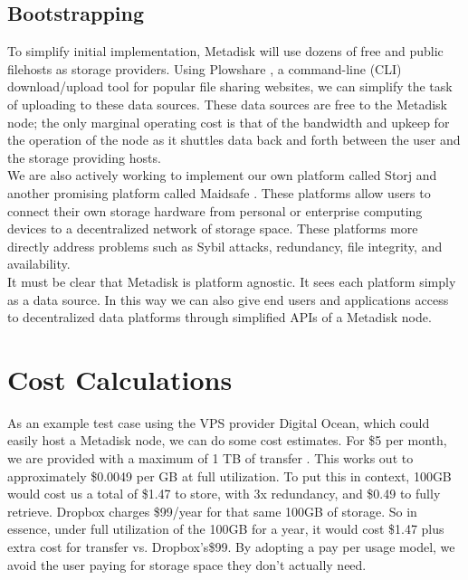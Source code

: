 \documentclass[a4paper,10pt]{article}
\begin{document}
\subsection{Bootstrapping}

To simplify initial implementation, Metadisk will use dozens of free and public filehosts as storage providers. Using Plowshare \cite{6}, a command-line (CLI) download/upload tool for popular file sharing websites, we can simplify the task of uploading to these data sources.  These data sources are free to the Metadisk node; the only marginal operating cost is that of the bandwidth and upkeep for the operation of the node as it shuttles data back and forth between the user and the storage providing hosts. \\

We are also actively working to implement our own platform called Storj \cite{7} and another promising platform called Maidsafe \cite{1}. These platforms allow users to connect their own storage hardware from personal or enterprise computing devices to a decentralized network of storage space. These platforms more directly address problems such as Sybil attacks, redundancy, file integrity, and availability.  \\

It must be clear that Metadisk is platform agnostic. It sees each platform simply as a data source. In this way we can also give end users and applications access to decentralized data platforms through simplified APIs of a Metadisk node. 

\section{Cost Calculations}

As an example test case using the VPS provider Digital Ocean, which could easily host a Metadisk node, we can do some cost estimates. For \$5 per month, we are provided with a maximum of 1 TB of transfer \cite{8}. This works out to approximately \$0.0049 per GB at full utilization. To put this in context, 100GB would cost us a total of \$1.47 to store, with 3x redundancy, and \$0.49 to fully retrieve.  Dropbox charges \$99/year for that same 100GB of storage. So in essence, under full utilization of the 100GB for a year, it would cost \$1.47 plus extra cost for transfer vs. Dropbox’s\$99.  By adopting a pay per usage model, we avoid the user  paying for storage space they don’t actually need.
\end{document}
